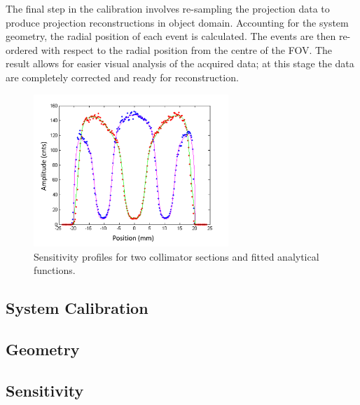 The final step in the calibration involves re-sampling the projection data to produce projection reconstructions in object domain. Accounting for the system geometry, the radial position of each event is calculated. The events are then re-ordered with respect to the radial position from the centre of the FOV. The result allows for easier visual analysis of the acquired data; at this stage the data are completely corrected and ready for reconstruction. 

\begin{figure}[!t]
\centering
\includegraphics[width=2.9in]{figures/sns_prof.png}

\caption{Sensitivity profiles for two collimator sections and fitted analytical functions.}
\label{fig_sensprof}
\end{figure}

\subsection{System Calibration}
\subsection{Geometry}
\subsection{Sensitivity}

